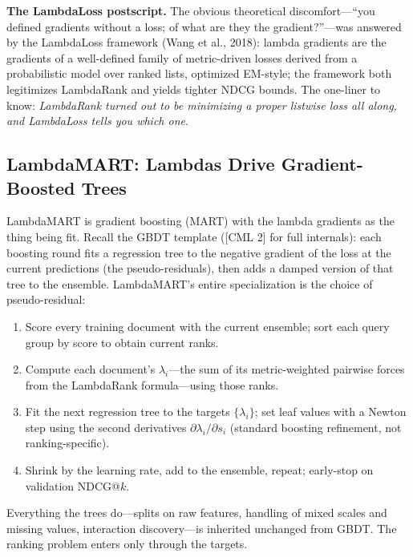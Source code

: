\textbf{The LambdaLoss postscript.} The obvious theoretical discomfort---``you defined gradients without a loss; of what are they the gradient?''---was answered by the LambdaLoss framework (Wang et al., 2018): lambda gradients are the gradients of a well-defined family of metric-driven losses derived from a probabilistic model over ranked lists, optimized EM-style; the framework both legitimizes LambdaRank and yields tighter NDCG bounds. The one-liner to know: \textit{LambdaRank turned out to be minimizing a proper listwise loss all along, and LambdaLoss tells you which one}.

\subsection{LambdaMART: Lambdas Drive Gradient-Boosted Trees}

LambdaMART is gradient boosting (MART) with the lambda gradients as the thing being fit. Recall the GBDT template ([CML 2] for full internals): each boosting round fits a regression tree to the negative gradient of the loss at the current predictions (the pseudo-residuals), then adds a damped version of that tree to the ensemble. LambdaMART's entire specialization is the choice of pseudo-residual:

\begin{enumerate}
    \item Score every training document with the current ensemble; sort each query group by score to obtain current ranks.
    \item Compute each document's $\lambda_i$---the sum of its metric-weighted pairwise forces from the LambdaRank formula---using those ranks.
    \item Fit the next regression tree to the targets $\{\lambda_i\}$; set leaf values with a Newton step using the second derivatives $\partial \lambda_i / \partial s_i$ (standard boosting refinement, not ranking-specific).
    \item Shrink by the learning rate, add to the ensemble, repeat; early-stop on validation NDCG@$k$.
\end{enumerate}

Everything the trees do---splits on raw features, handling of mixed scales and missing values, interaction discovery---is inherited unchanged from GBDT. The ranking problem enters only through the targets.

